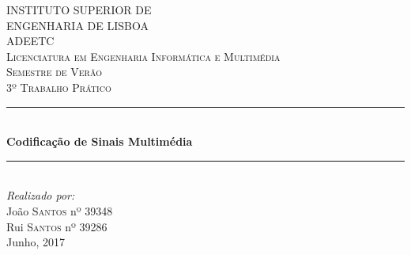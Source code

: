 \documentclass[12pt,a4paper]{article}
\begin{document}
\begin{titlepage}

\newcommand{\HRule}{\rule{\linewidth}{0.5mm}} %

\center %
 

\textsc{\LARGE INSTITUTO SUPERIOR DE \\[0.2cm] ENGENHARIA DE LISBOA}\\[0.5cm]
\textsc{\LARGE ADEETC  }\\[0.3cm]
\textsc{\Large Licenciatura em Engenharia Informática e Multimédia }\\[0.3cm]
\textsc{\Large Semestre de Verão}\\[0.5cm]
\textsc{\Large 3º Trabalho Prático}\\[0.5cm]


\HRule \\[0.4cm]
{ \huge \bfseries Codificação de Sinais Multimédia}\\[0.03cm] %
\HRule \\[1.5cm]

\Large \emph{Realizado por:}\\
João \textsc{Santos} nº 39348\\ 
Rui \textsc{Santos} nº 39286\\[2cm] 

{\large Junho, 2017}\\[1cm]



\end{titlepage}
\end{document}
